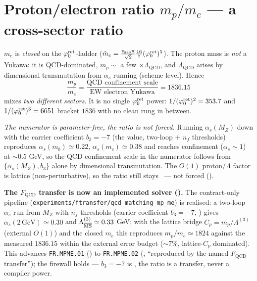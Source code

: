 \section{Proton/electron ratio $m_p/m_e$ --- a cross-sector ratio}
$m_e$ is \emph{closed} on the $\varphi_0^{\mathrm{ret}}$-ladder ($\hat m_e=\tfrac{v_{\mathrm{geo}}\pi}{\sqrt2}\tfrac{16}{7}(\varphi_0^{\mathrm{ret}})^5$).
The proton mass is \emph{not} a Yukawa: it is QCD-dominated, $m_p\sim$ a few $\times\Lambda_{\mathrm{QCD}}$,
and $\Lambda_{\mathrm{QCD}}$ arises by dimensional transmutation from $\alpha_s$ running (scheme level).
Hence
\[
  \frac{m_p}{m_e}=\frac{\text{QCD confinement scale}}{\text{EW electron Yukawa}}=1836.15
\]
mixes \emph{two different sectors}. It is no single $\varphi_0^{\mathrm{ret}}$ power: $1/(\varphi_0^{\mathrm{ret}})^2=353.7$ and
$1/(\varphi_0^{\mathrm{ret}})^3=6651$ bracket $1836$ with no clean rung in between.

\emph{The numerator is parameter-free, the ratio is not forced.} Running $\alpha_s(M_Z)$ down
with the carrier coefficient $b_3=-7$ (the  value,
two-loop $+$ $n_f$ thresholds) reproduces $\alpha_s(m_b)\simeq0.22$, $\alpha_s(m_c)\simeq0.38$ and
reaches confinement ($\alpha_s\sim1$) at $\sim0.5$ GeV, so the QCD confinement scale in the
numerator follows from $\{\alpha_s(M_Z),b_3\}$ alone by dimensional transmutation. The
$O(1)$ proton/$\Lambda$ factor is lattice (non-perturbative), so the ratio still stays \mO\
--- not forced ().
\par\smallskip\noindent\textbf{The $F_{\mathrm{QCD}}$ transfer is now an implemented solver
(\veri{v262\_fqcd\_mp\_me.py}).} The contract-only pipeline
(\texttt{experiments/ftransfer/qcd\_matching\_mp\_me}) is realised: a two-loop $\alpha_s$ run from
$M_Z$ with $n_f$ thresholds (carrier coefficient $b_3=-7$, \mE) gives $\alpha_s(2\,\text{GeV})\simeq0.30$
and $\Lambda^{(3)}_{\overline{\rm MS}}\simeq0.33$ GeV; with the lattice bridge $C_p=m_p/\Lambda^{(3)}$
(external $O(1)$) and the closed $m_e$ this reproduces $m_p/m_e\simeq1824$ against the measured $1836.15$
within the external error budget ($\sim7\%$, lattice-$C_p$ dominated). This advances \texttt{FR.MPME.01}
(\mO) to \texttt{FR.MPME.02} (\mC, ``reproduced by the named $F_{\mathrm{QCD}}$ transfer''); the firewall
holds --- $b_3=-7$ is \mE, the ratio is a transfer, never a compiler power.

